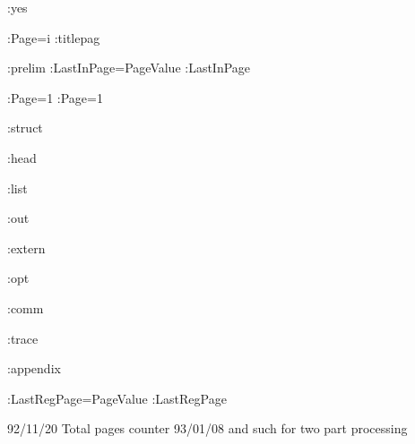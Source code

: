%
\makeatletter
\makeatother
{}


%
\def\SerifFace{\TypeFace:ComputerModern }
\def\SansFace{\TypeFace:ComputerSans }
\comment
\def\SerifFace{\TypeFace:macTimes }
\def\SansFace{\TypeFace:macHelvetica }
\def\SerifFace{\TypeFace:unixTimes }
\def\SansFace{\TypeFace:unixHelvetica }
\endcomment 



\WriteExtern:yes



\Start


\CounterRepresentation:Page=i \RightPage
\InputFile:titlepag

\InputFile:prelim
\SetCounter:LastInPage=PageValue
\BackStepCounter:LastInPage

\ToRecto\RightPage
\CounterRepresentation:Page=1 \SetCounter:Page=1

\InputFile:struct

\InputFile:head

\InputFile:list


\InputFile:out

\InputFile:extern

\InputFile:opt

\InputFile:comm

\InputFile:trace

\InputFile:appendix

\SetCounter:LastRegPage=PageValue
\BackStepCounter:LastRegPage
\Stop

92/11/20 Total pages counter
93/01/08 \comment and such for two part processing
